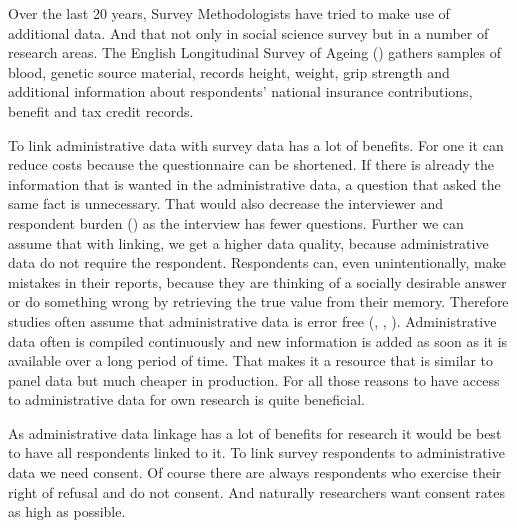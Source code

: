 Over the last 20 years, Survey Methodologists have tried to make use of additional data. And that not only in social science survey but in a number of research areas. The English Longitudinal Survey of Ageing (\cite{Marmotetal03}) gathers samples of blood, genetic source material, records height, weight, grip strength and additional information about respondents' national insurance contributions, benefit and tax credit records.

To link administrative data with survey data has a lot of benefits. For one it can reduce costs because the questionnaire can be shortened. If there is already the information that is wanted in the administrative data, a question that asked the same fact is unnecessary. That would also decrease the interviewer and respondent burden (\cite{Salaetal10}) as the interview has fewer questions. Further we can assume that with linking, we get a higher data quality, because administrative data do not require the respondent. Respondents can, even unintentionally, make mistakes in their reports, because they are thinking of a socially desirable answer or do something wrong by retrieving the true value from their memory. Therefore studies often assume that administrative data is error free (\cite{Davernetal08}, \cite{Kreuteretal08,Kreuteretal10}, \cite{Sakshaugetal10}). Administrative data often is compiled continuously and new information is added as soon as it is available  over a long period of time. That makes it a resource that is similar to panel data but much cheaper in production. For all those reasons to have access to administrative data for own research is quite beneficial.

As administrative  data linkage has a lot of benefits for research it would be best to have all respondents linked to it. To link survey respondents to administrative data we need consent. Of course there are always respondents who exercise their right of refusal and do not consent. And naturally researchers want consent rates as high as possible.


